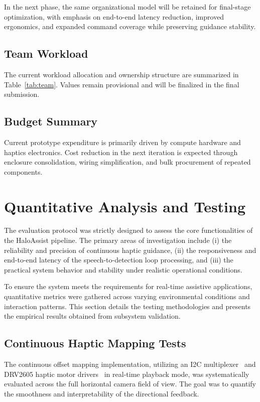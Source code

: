 \documentclass{article}
\begin{document}
In the next phase, the same organizational model will be retained for final-stage optimization, with emphasis on end-to-end latency reduction, improved ergonomics, and expanded command coverage while preserving guidance stability.

\subsection{Team Workload}

The current workload allocation and ownership structure are summarized in Table~\ref{tab:team}. Values remain provisional and will be finalized in the final submission.

\subsection{Budget Summary}

Current prototype expenditure is primarily driven by compute hardware and haptics electronics. Cost reduction in the next iteration is expected through enclosure consolidation, wiring simplification, and bulk procurement of repeated components.

\section{Quantitative Analysis and Testing}

The evaluation protocol was strictly designed to assess the core functionalities of the HaloAssist pipeline. The primary areas of investigation include (i) the reliability and precision of continuous haptic guidance, (ii) the responsiveness and end-to-end latency of the speech-to-detection loop processing, and (iii) the practical system behavior and stability under realistic operational conditions. 

To ensure the system meets the requirements for real-time assistive applications, quantitative metrics were gathered across varying environmental conditions and interaction patterns. This section details the testing methodologies and presents the empirical results obtained from subsystem validation.

\subsection{Continuous Haptic Mapping Tests}

The continuous offset mapping implementation, utilizing an I2C multiplexer~\cite{nxp_i2c} and DRV2605 haptic motor drivers~\cite{ti_drv2605} in real-time playback mode, was systematically evaluated across the full horizontal camera field of view. The goal was to quantify the smoothness and interpretability of the directional feedback.
\end{document}
